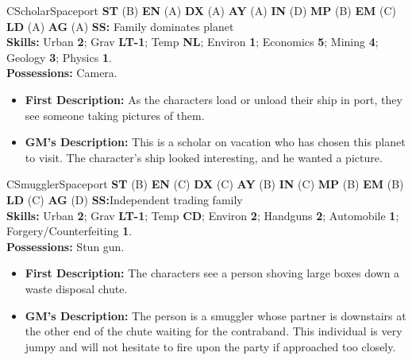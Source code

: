 \hrulefill

\begin{npc}{C}{Scholar}{Spaceport}
  \textbf{ST} (B) \textbf{EN} (A) \textbf{DX} (A) \textbf{AY} (A)
  \textbf{IN} (D) \textbf{MP} (B) \textbf{EM} (C) \textbf{LD} (A)
  \textbf{AG} (A) \textbf{SS:} Family dominates planet \\ 
  \textbf{Skills:} Urban \textbf{2}; Grav \textbf{LT-1}; Temp
  \textbf{NL}; Environ \textbf{1}; Economics \textbf{5}; Mining
  \textbf{4}; Geology \textbf{3}; Physics \textbf{1}. \\ 
  \textbf{Possessions:} Camera.
\begin{itemize}
\item \textbf{First Description:} As the characters load or unload
  their ship in port, they see someone taking pictures of them.
\item \textbf{GM's Description:} This is a scholar on vacation who has
  chosen this planet to visit. The character's ship looked
  interesting, and he wanted a picture.
\end{itemize}
\end{npc}

\hrulefill

\begin{npc}{C}{Smuggler}{Spaceport}
\textbf{ST} (B) \textbf{EN} (C) \textbf{DX} (C) \textbf{AY} (B)
\textbf{IN} (C) \textbf{MP} (B) \textbf{EM} (B) \textbf{LD} (C)
\textbf{AG} (D) \textbf{SS:}Independent trading family \\ 
\textbf{Skills:} Urban \textbf{2}; Grav \textbf{LT-1}; Temp
\textbf{CD}; Environ \textbf{2}; Handguns \textbf{2}; Automobile
\textbf{1}; Forgery/Counterfeiting \textbf{1}. \\ 
\textbf{Possessions:} Stun gun. 
\begin{itemize}
\item \textbf{First Description:} The characters see a person shoving
  large boxes down a waste disposal chute.
\item \textbf{GM's Description:} The person is a smuggler whose
  partner is downstairs at the other end of the chute waiting for the
  contraband.  This individual is very jumpy and will not hesitate to
  fire upon the party if approached too closely.
\end{itemize}
\end{npc}

\hrulefill

